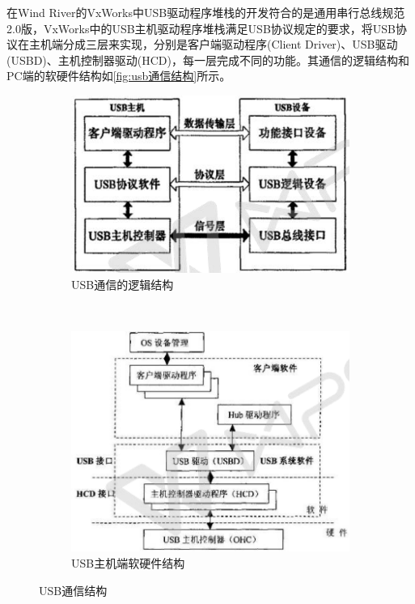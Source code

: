 	在Wind River的VxWorks中USB驱动程序堆栈的开发符合的是通用串行总线规范2.0版，VxWorks中的USB主机驱动程序堆栈满足USB协议规定的要求，将USB协议在主机端分成三层来实现，分别是客户端驱动程序(Client Driver)、USB驱动(USBD)、主机控制器驱动(HCD)，每一层完成不同的功能。其通信的逻辑结构和PC端的软硬件结构如\autoref{fig:usb通信结构}所示。
\begin{figure}[h]
\centering
  \begin{subfigure}[b]{0.4\textwidth}
  \includegraphics[width=1.0\textwidth]{./graphics/USB-device-structure-diagram.pdf}
  \caption{USB通信的逻辑结构}\label{fig:usb通信逻辑结构}
  \end{subfigure}
  ~
  \begin{subfigure}[b]{0.5\textwidth}
  \includegraphics[width=1.0\textwidth]{./graphics/USB-PC-structure.pdf}
  \caption{USB主机端软硬件结构}\label{fig:usb-PC}
  \end{subfigure}
\caption{USB通信结构}\label{fig:USB通信结构}
\end{figure}
	

